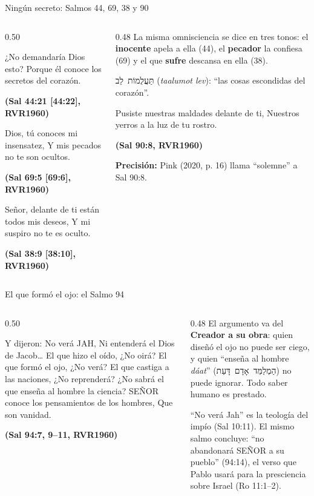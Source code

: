 \documentclass[hyperref={bookmarks=false},aspectratio=169]{beamer}
\newcommand{\heb}[1]{\mbox{\foreignlanguage{hebrew}{#1}}}
\newcommand{\SENOR}{S{\fontsize{0.78em}{1em}\selectfont EÑOR}}
\newcommand{\fuente}[1]{\par\hfill{\upshape\bfseries\footnotesize\textcolor{azul}{#1}}}
\newcommand{\destacar}[1]{\textbf{\textcolor{azul}{#1}}}
\newcommand{\precision}[1]{{\footnotesize\color{gris}\textbf{Precisión:} #1}}
\begin{document}
\begin{frame}{Ningún secreto: Salmos 44, 69, 38 y 90}
\begin{columns}[t,onlytextwidth]
\begin{column}{0.50\textwidth}
\begin{cita}¿No demandaría Dios esto? Porque él conoce los secretos del corazón.\fuente{(Sal 44:21 [44:22], RVR1960)}\end{cita}
\begin{cita}Dios, tú conoces mi insensatez, Y mis pecados no te son ocultos.\fuente{(Sal 69:5 [69:6], RVR1960)}\end{cita}
\begin{cita}Señor, delante de ti están todos mis deseos, Y mi suspiro no te es oculto.\fuente{(Sal 38:9 [38:10], RVR1960)}\end{cita}
\end{column}
\begin{column}{0.48\textwidth}\small
La misma omnisciencia se dice en tres tonos: el \destacar{inocente} apela a ella (44), el \destacar{pecador} la confiesa (69) y el que \destacar{sufre} descansa en ella (38).\par\medskip
\scriptsize\heb{תַּעֲלֻמוֹת לֵב} (\emph{taalumot lev}): ``las cosas escondidas del corazón''.\par\medskip
\begin{cita}Pusiste nuestras maldades delante de ti, Nuestros yerros a la luz de tu rostro.\fuente{(Sal 90:8, RVR1960)}\end{cita}
\precision{Pink (2020, p. 16) llama ``solemne'' a Sal 90:8.}
\end{column}
\end{columns}
\end{frame}

\begin{frame}{El que formó el ojo: el Salmo 94}
\begin{columns}[t,onlytextwidth]
\begin{column}{0.50\textwidth}
\begin{cita}Y dijeron: No verá JAH, Ni entenderá el Dios de Jacob\ldots{} El que hizo el oído, ¿No oirá? El que formó el ojo, ¿No verá? El que castiga a las naciones, ¿No reprenderá? ¿No sabrá el que enseña al hombre la ciencia? \SENOR{} conoce los pensamientos de los hombres, Que son vanidad.\fuente{(Sal 94:7, 9--11, RVR1960)}\end{cita}
\end{column}
\begin{column}{0.48\textwidth}\small
El argumento va del \destacar{Creador a su obra}: quien diseñó el ojo no puede ser ciego, y quien ``enseña al hombre \emph{dáat}'' (\heb{הַמְלַמֵּד אָדָם דָּעַת}) no puede ignorar. Todo saber humano es prestado.\par\medskip
``No verá Jah'' es la teología del impío (Sal 10:11). El mismo salmo concluye: ``no abandonará \SENOR{} a su pueblo'' (94:14), el verso que Pablo usará para la presciencia sobre Israel (Ro 11:1--2).
\end{column}
\end{columns}
\end{frame}
\end{document}
